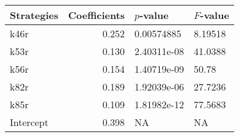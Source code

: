 \begin{tabular}{lrll}
\toprule
Strategies &  Coefficients &    $p$-value & $F$-value \\
\midrule
      k46r &         0.252 &   0.00574885 &   8.19518 \\
      k53r &         0.130 &  2.40311e-08 &   41.0388 \\
      k56r &         0.154 &  1.40719e-09 &     50.78 \\
      k82r &         0.189 &  1.92039e-06 &   27.7236 \\
      k85r &         0.109 &  1.81982e-12 &   77.5683 \\
 Intercept &         0.398 &           NA &        NA \\
\bottomrule
\end{tabular}
